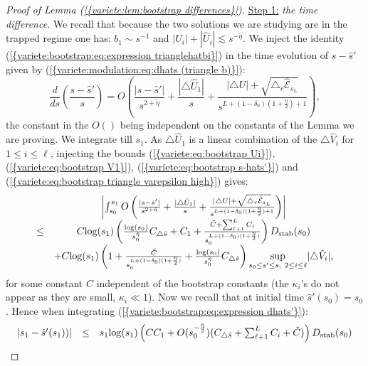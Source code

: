\documentclass[11pt,a4paper,reqno]{amsart}
\theoremstyle{remark}
\numberwithin{equation}{section}
\begin{document}
\begin{proof}[Proof of Lemma {{\rm (\ref{{variete:lem:bootstrap differences}})}}]
\underline{Step 1:} \emph{the time difference}. We recall that because the two solutions we are studying are in the trapped regime one has: $b_1\sim s^{-1}$ and $|U_i|+|\hat{U}_i|\lesssim s^{-\tilde{\eta}}$. We inject the identity {{\rm (\ref{{variete:bootstrap:eq:expression trianglehatbi}})}} in the time evolution of $s-\hat{s}'$ given by {{\rm (\ref{{variete:modulation:eq:dhats (triangle b)}})}}:
\begin{equation} \label{variete:bootstrap:eq:expression dhats'}
\frac{d}{ds}\left(\frac{s-\hat{s}'}{s} \right)=O\left(\frac{|s-\hat{s}'|}{s^{2+\tilde{\eta}}}+\frac{|\triangle \hat{U}_1|}{s}+\frac{|\triangle U|+\sqrt{\triangle_r \hat{\mathcal{E}}_{s_L}}}{s^{L+(1-\delta_0)(1+\frac{\eta}{2})+1}} \right),
\end{equation}
the constant in the $O()$ being independent on the constants of the Lemma we are proving. We integrate till $s_1$. As $\triangle \hat{U}_1$ is a linear combination of the $\triangle \hat{V}_i$ for $1\leq i \leq \ell$, injecting the bounds {{\rm (\ref{{variete:eq:bootstrap Ui}})}}, {{\rm (\ref{{variete:eq:bootstrap V1}})}}, {{\rm (\ref{{variete:eq:bootstrap s-hats'}})}} and {{\rm (\ref{{variete:eq:bootstrap triangle varepsilon high}})}} gives:
$$
\begin{array}{r c l}
&\left| \int_{s_0}^{s_1}O\left(\frac{|s-\hat{s}'|}{s^{2+\tilde{\eta}}}+\frac{|\triangle \hat{U}_1|}{s}+\frac{|\triangle U|+\sqrt{\triangle_r \hat{\mathcal{E}}_{s_L}}}{s^{L+(1-\delta_0)(1+\frac{\eta}{2})+1}} \right) \right| \\
\leq& C\text{log}(s_1) \left( \frac{\text{log}(s_0)}{s_0^{\tilde{\eta}}}C_{\triangle \hat{s}}+C_1+\frac{\tilde{C}+\sum_{\ell+1}^L C_i}{s_0^{L+(1-\delta_0)(1+\frac{\eta}{2})}} \right)D_{\text{stab}}(s_0)\\
&+C\text{log}(s_1)\left( 1+\frac{\tilde{C}}{s_0^{L+(1-\delta_0)(1+\frac{\eta}{2})}}+ \frac{\text{log}(s_0)}{s_0^{\tilde{\eta}}}C_{\triangle \hat{s}} \right)  \underset{s_0\leq s' \leq s, \ 2\leq i \leq \ell}{\text{sup}}|\triangle \hat{V}_i| ,
\end{array}
$$
for some constant $C$ independent of the bootstrap constants (the $\kappa_i$'s do not appear as they are small, $\kappa_i\ll 1$). Now we recall that at initial time $\hat{s}'(s_0)=s_0$. Hence when integrating {{\rm (\ref{{variete:bootstrap:eq:expression dhats'}})}}:
$$
\begin{array}{r c l}
|s_1-\hat{s}'(s_1))|& \leq &  s_1\text{log}(s_1) \left( CC_1+O(s_0^{-\frac{\tilde{\eta}}{2}})(C_{\triangle \hat{s}}+\sum_{\ell+1}^L C_i+\tilde{C}) \right)D_{\text{stab}}(s_0)\\

\end{array}$$
\end{proof}
\end{document}
